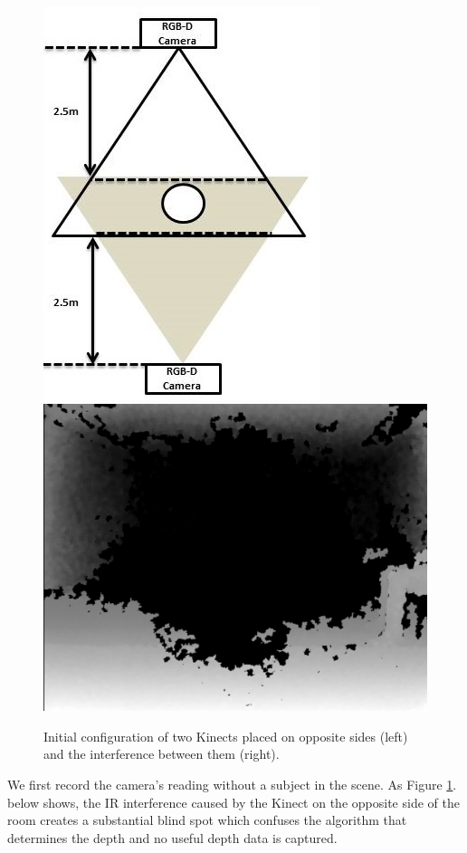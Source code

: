 \documentclass[11pt,a4paper]{article}
\begin{document}
\begin{figure}[H]
\centering
\includegraphics[scale=0.4]{figure_2cameras_opposite.jpg}
\includegraphics[scale=0.16]{IR_Interference2.jpg}
\caption{Initial configuration of two Kinects placed on opposite sides (left) and the interference between them (right).}
\label{2_cameras_config1}
\end{figure}

\noindent
We first record the camera's reading without a subject in the scene. As Figure \ref{2_cameras_config1}. below shows, the IR interference caused by the Kinect on the opposite side of the room creates a substantial blind spot which confuses the algorithm that determines the depth and no useful depth data is captured.
 
\end{document}
